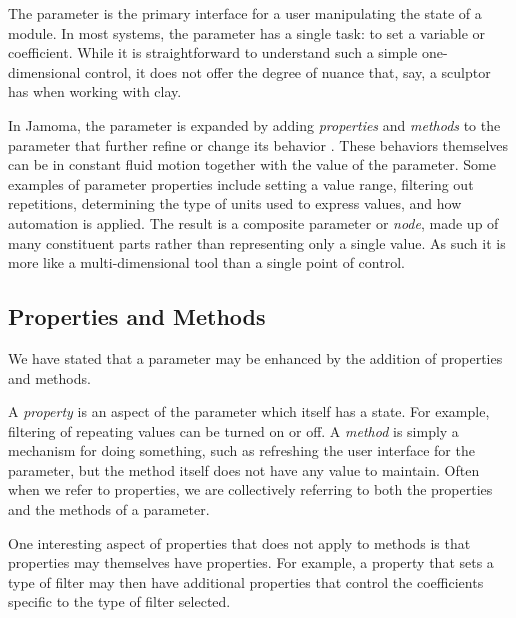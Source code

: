 \documentclass{article}
\begin{document}

The parameter is the primary interface for a user manipulating the state of a module. In most systems, the parameter has a single task: to set a variable or coefficient. While it is straightforward to understand such a simple one-dimensional control, it does not offer the degree of nuance that, say, a sculptor has when working with clay.

In Jamoma, the parameter is expanded by adding \emph{properties} and \emph{methods} to the parameter that further refine or change its behavior \cite{Place:2008}. These behaviors themselves can be in constant fluid motion together with the value of the parameter. Some examples of parameter properties include setting a value range, filtering out repetitions, determining the type of units used to express values, and how automation is applied.  The result is a composite parameter or \emph{node}, made up of many constituent parts rather than representing only a single value. As such it is more like a multi-dimensional tool than a single point of control.

\subsection{Properties and Methods} %
\label{sec:properties_and_methods}

We have stated that a parameter may be enhanced by the addition of properties and methods. 

A \emph{property} is an aspect of the parameter which itself has a state. For example, filtering of repeating values can be turned on or off. A \emph{method} is simply a mechanism for doing something, such as refreshing the user interface for the parameter, but the method itself does not have any value to maintain. Often when we refer to properties, we are collectively referring to both the properties and the methods of a parameter.

One interesting aspect of properties that does not apply to methods is that properties may themselves have properties. For example, a property that sets a type of filter may then have additional properties that control the coefficients specific to the type of filter selected.
\end{document}
